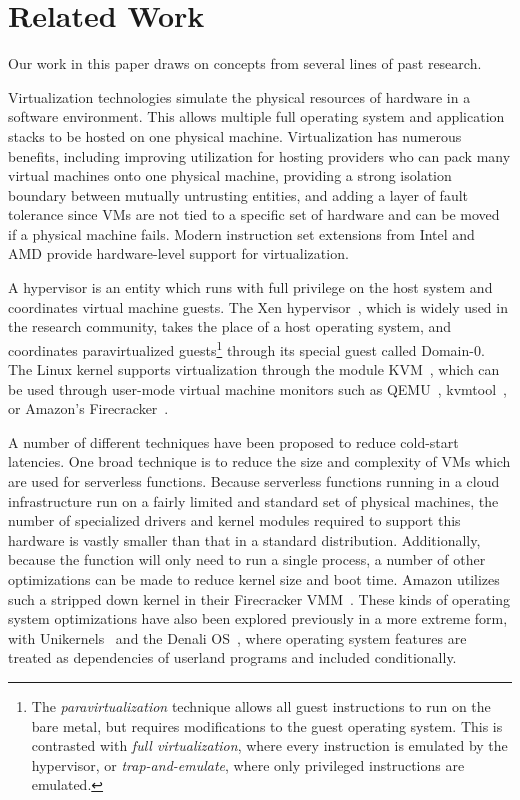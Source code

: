 \section{Related Work} \label{sec:related}
Our work in this paper draws on concepts from several lines of past research.

 Virtualization technologies simulate the
physical resources of hardware in a software environment. This allows multiple
full operating system and application stacks to be hosted on one physical
machine. Virtualization has numerous benefits, including improving utilization
for hosting providers who can pack many virtual machines onto one physical
machine, providing a strong isolation boundary between mutually untrusting
entities, and adding a layer of fault tolerance since VMs are not tied to a
specific set of hardware and can be moved if a physical machine fails. Modern
instruction set extensions from Intel and AMD provide hardware-level support
for virtualization.~\cite{virt-techniques}

A hypervisor is an entity which runs with full privilege on the host system and
coordinates virtual machine guests. The Xen hypervisor~\cite{xen}, which is
widely used in the research community, takes the place of a host operating
system, and coordinates paravirtualized guests\footnote{The
\emph{paravirtualization} technique allows all guest instructions to run on the
bare metal, but requires modifications to the guest operating system. This is
contrasted with \emph{full virtualization}, where every instruction is emulated
by the hypervisor, or \emph{trap-and-emulate}, where only privileged
instructions are emulated.} through its special guest called Domain-0. The Linux
kernel supports virtualization through the module KVM~\cite{kvm}, which can be
used through user-mode virtual machine monitors such as QEMU~\cite{qemu},
kvmtool~\cite{kvmtool}, or Amazon's Firecracker~\cite{firecracker}.

 A number of different techniques have
been proposed to reduce cold-start latencies. One broad technique is to reduce
the size and complexity of VMs which are used for serverless functions. Because
serverless functions running in a cloud infrastructure run on a fairly limited
and standard set of physical machines, the number of specialized drivers and
kernel modules required to support this hardware is vastly smaller than that in
a standard distribution.  Additionally, because the function will only need to
run a single process, a number of other optimizations can be made to reduce
kernel size and boot time. Amazon utilizes such a stripped down kernel in their
Firecracker VMM~\cite{firecracker}. These kinds of operating system
optimizations have also been explored previously in a more extreme form, with
Unikernels~\cite{unikernels} and the Denali OS~\cite{denali}, where operating
system features are treated as dependencies of userland programs and included
conditionally.

